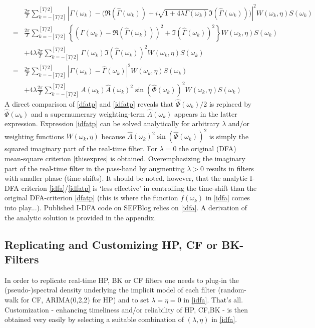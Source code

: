 \documentclass[11pt]{article}
\begin{document}
\begin{eqnarray}
&&\frac{2\pi}{T} \sum_{k=-[T/2]}^{[T/2]}
 \left|\Gamma(\omega_k)-\Big(\Re\left(\hat{\Gamma}(\omega_k)\right)+i\sqrt{1+4\lambda\Gamma(\omega_k)}\Im\left(\hat{\Gamma}(\omega_k)\right)\Big)\right|^2 W(\omega_k,\eta)S(\omega_k)\label{idfa_t}\\
&=&\frac{2\pi}{T} \sum_{k=-[T/2]}^{[T/2]}
  \left\{\left(\Gamma(\omega_k)-\Re\left(\hat{\Gamma}(\omega_k)\right)\right)^2+\Im\left(\hat{\Gamma}(\omega_k)\right)^2\right\}W(\omega_k,\eta)S(\omega_k)\nonumber\\
&&+4\lambda\frac{2\pi}{T} \sum_{k=-[T/2]}^{[T/2]}
  \Gamma(\omega_k)\Im\left(\hat{\Gamma}(\omega_k)\right)^2W(\omega_k,\eta)S(\omega_k) \nonumber\\
&=&\frac{2\pi}{T} \sum_{k=-[T/2]}^{[T/2]}
 |\Gamma(\omega_k)-\hat{\Gamma}(\omega_k)|^2 W(\omega_k,\eta)S(\omega_k)\nonumber\\
&&+4\lambda\frac{2\pi}{T} \sum_{k=-[T/2]}^{[T/2]}
  A(\omega_k)\hat{A}(\omega_k)^2\sin(\hat{\Phi}(\omega_k))^2W(\omega_k,\eta)S(\omega_k)\label{idfatp}
\end{eqnarray}
A direct comparison of \ref{dfatp} and \ref{idfatp} reveals that $\hat{\Phi}(\omega_k)/2$ is replaced by $\hat{\Phi}(\omega_k)$ and a supernumerary weighting-term $\hat{A}(\omega_k)$ appears in the latter expression. Expression \ref{idfatp} can be solved analytically for arbitrary $\lambda$ and/or weighting functions $W(\omega_k,\eta)$ because $\hat{A}(\omega_k)^2\sin(\hat{\Phi}(\omega_k))^2$ is simply the squared imaginary part of the real-time filter. For $\lambda=0$ the original (DFA) mean-square criterion \ref{thisexpres} is obtained. Overemphasizing the imaginary part of the real-time filter in the pass-band by augmenting $\lambda>0$ results in filters with smaller phase (time-shifts). It should be noted, however, that the analytic I-DFA criterion \ref{idfa}/\ref{idfatp} is `less effective' in controlling the time-shift than the original DFA-criterion \ref{dfatp} (this is where the function $f(\omega_k)$ in \ref{idfa} comes into play...). Published I-DFA code on SEFBlog relies on \ref{idfa}. A derivation of the analytic solution is provided in the appendix.


\subsection{Replicating and Customizing HP, CF or BK-Filters}

In order to replicate real-time HP, BK or CF filters one needs to plug-in the (pseudo-)spectral density underlying the implicit model of each filter (random-walk for CF, ARIMA(0,2,2) for HP) 
and to set $\lambda=\eta=0$ in \ref{idfa}. That's all. Customization - enhancing timeliness and/or reliability of HP, CF,BK - is then obtained very easily by selecting a suitable combination of $(\lambda,\eta)$ in \ref{idfa}. 
\end{document}
